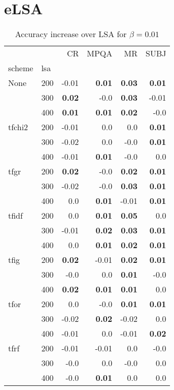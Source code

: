 \section{eLSA}

\begin{table}[h]
\begin{center}

\begin{tabular}{ll|rrrr}
\toprule
   &   &   CR &  MPQA &   MR &  SUBJ \\
scheme & lsa &        &        &        &        \\
\midrule
None & 200 &     -0.01 & \textbf{0.01} & \textbf{0.03} & \textbf{0.01} \\
   & 300 & \textbf{0.02} &     -0.0 & \textbf{0.03} &     -0.01 \\
   & 400 & \textbf{0.01} & \textbf{0.01} & \textbf{0.02} &     -0.0 \\
tfchi2 & 200 &     -0.01 &      0.0 &      0.0 & \textbf{0.01} \\
   & 300 &     -0.02 &      0.0 &     -0.0 & \textbf{0.01} \\
   & 400 &     -0.01 & \textbf{0.01} &     -0.0 &      0.0 \\
tfgr & 200 & \textbf{0.02} &     -0.0 & \textbf{0.02} & \textbf{0.01} \\
   & 300 &     -0.02 &     -0.0 & \textbf{0.03} & \textbf{0.01} \\
   & 400 &      0.0 & \textbf{0.01} &     -0.01 & \textbf{0.01} \\
tfidf & 200 &      0.0 & \textbf{0.01} & \textbf{0.05} &      0.0 \\
   & 300 &     -0.01 & \textbf{0.02} & \textbf{0.03} & \textbf{0.01} \\
   & 400 &      0.0 & \textbf{0.01} & \textbf{0.02} & \textbf{0.01} \\
tfig & 200 & \textbf{0.02} &     -0.01 & \textbf{0.02} & \textbf{0.01} \\
   & 300 &     -0.0 &      0.0 & \textbf{0.01} &     -0.0 \\
   & 400 & \textbf{0.02} & \textbf{0.01} & \textbf{0.01} &      0.0 \\
tfor & 200 &      0.0 &     -0.0 & \textbf{0.01} & \textbf{0.01} \\
   & 300 &     -0.02 & \textbf{0.02} &     -0.02 &      0.0 \\
   & 400 &     -0.01 &      0.0 &     -0.01 & \textbf{0.02} \\
tfrf & 200 &     -0.01 &     -0.01 &      0.0 &     -0.0 \\
   & 300 &     -0.0 &      0.0 &     -0.0 &      0.0 \\
   & 400 &     -0.0 & \textbf{0.01} &      0.0 &      0.0 \\
\bottomrule
\end{tabular}

\caption[Accuracy increase over LSA for $\beta=0.01$]{Accuracy increase over LSA for $\beta=0.01$}
\label{tab:batch:results0.01}
\end{center}
\end{table}







